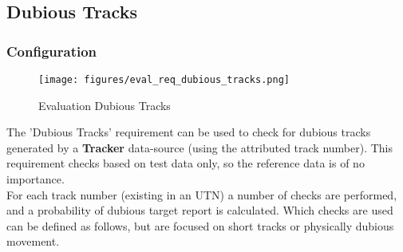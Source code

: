 \subsection{Dubious Tracks}
\label{sec:eval_req_dubious_tracks} 

\subsubsection{Configuration}

\begin{figure}[H]
    \texttt{[image: figures/eval\_req\_dubious\_tracks.png]}
   \caption{Evaluation Dubious Tracks}
\end{figure}

The 'Dubious Tracks' requirement can be used to check for dubious tracks generated by a \textbf{Tracker} data-source (using the attributed track number). This requirement checks based on test data only, so the reference data is of no importance. \\

For each track number (existing in an UTN) a number of checks are performed, and a probability of dubious target report is calculated. Which checks are used can be defined as follows, but are focused on short tracks or physically dubious movement. \\

